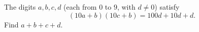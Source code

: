 The digits $a,b,c,d$ (each from $0$ to $9$, with $d\ne0$) satisfy
\[(10a+b)(10c+b)=100d+10d+d.\]
Find $a+b+c+d$.

